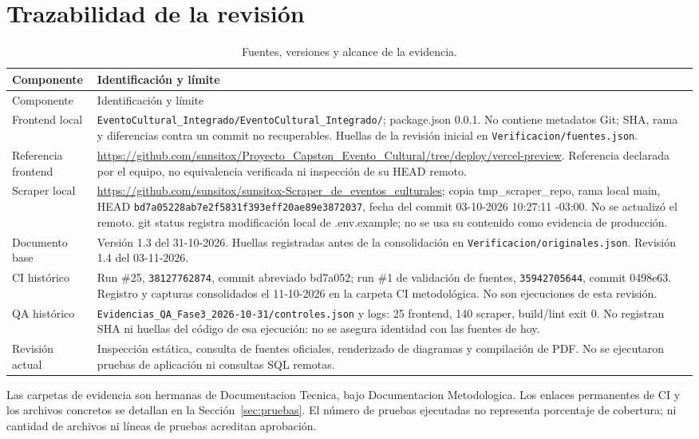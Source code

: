 \documentclass[11pt,a4paper]{article}
\begin{document}
\section{Trazabilidad de la revisión}
\label{sec:traza}
\begin{longtable}{p{3.3cm}p{10.4cm}}
\caption{Fuentes, versiones y alcance de la evidencia.}\label{tab:traza}\\
\toprule Componente & Identificación y límite \\\midrule\endfirsthead
\toprule Componente & Identificación y límite \\\midrule\endhead
Frontend local & \nolinkurl{EventoCultural_Integrado/EventoCultural_Integrado/}; package.json 0.0.1. No contiene metadatos Git; SHA, rama y diferencias contra un commit no recuperables. Huellas de la revisión inicial en \nolinkurl{Verificacion/fuentes.json}. \\
Referencia frontend & \url{https://github.com/sunsitox/Proyecto_Capston_Evento_Cultural/tree/deploy/vercel-preview}. Referencia declarada por el equipo, no equivalencia verificada ni inspección de su HEAD remoto. \\
Scraper local & \url{https://github.com/sunsitox/sunsitox-Scraper_de_eventos_culturales}; copia tmp\_scraper\_repo, rama local main, HEAD \nolinkurl{bd7a05228ab7e2f5831f393eff20ae89e3872037}, fecha del commit 03-10-2026 10:27:11 -03:00. No se actualizó el remoto. git status registra modificación local de .env.example; no se usa su contenido como evidencia de producción. \\
Documento base & Versión 1.3 del 31-10-2026. Huellas registradas antes de la consolidación en \nolinkurl{Verificacion/originales.json}. Revisión 1.4 del 03-11-2026. \\
CI histórico & Run \#25, \nolinkurl{38127762874}, commit abreviado bd7a052; run \#1 de validación de fuentes, \nolinkurl{35942705644}, commit 0498e63. Registro y capturas consolidados el 11-10-2026 en la carpeta CI metodológica. No son ejecuciones de esta revisión. \\
QA histórico & \nolinkurl{Evidencias_QA_Fase3_2026-10-31/controles.json} y logs: 25 frontend, 140 scraper, build/lint exit 0. No registran SHA ni huellas del código de esa ejecución: no se asegura identidad con las fuentes de hoy. \\
Revisión actual & Inspección estática, consulta de fuentes oficiales, renderizado de diagramas y compilación de PDF. No se ejecutaron pruebas de aplicación ni consultas SQL remotas. \\
\bottomrule\end{longtable}
Las carpetas de evidencia son hermanas de Documentacion Tecnica, bajo Documentacion
Metodologica. Los enlaces permanentes de CI y los archivos concretos se detallan en
la Sección~\ref{sec:pruebas}. El número de pruebas ejecutadas no representa porcentaje
de cobertura; ni cantidad de archivos ni líneas de pruebas acreditan aprobación.
\end{document}
